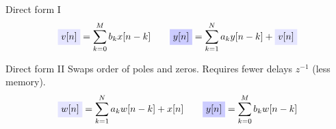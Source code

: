 \documentclass[10pt]{beamer}
\begin{document}
\begin{frame}{Direct form I}
	\begin{equation*}
	\tikz[baseline]{\node[fill=blue!10,anchor=base] {$v[n]$};} = \sum_{k = 0}^{M}b_kx[n-k] \qquad \tikz[baseline]{\node[fill=blue!20,anchor=base] {$y[n]$};} = \sum_{k = 1}^{N}a_ky[n-k] + \tikz[baseline]{\node[fill=blue!10,anchor=base] {$v[n]$};}
	\end{equation*}
\begin{center}
		\resizebox{0.7\textwidth}{!}{}
\end{center}
\end{frame}

\begin{frame}{Direct form II}
	Swaps order of poles and zeros. Requires fewer delays $z^{-1}$ (less memory).
	\begin{equation*}
	\tikz[baseline]{\node[fill=blue!10,anchor=base] {$w[n]$};} = \sum_{k = 1}^{N}a_kw[n-k] + x[n] \qquad \tikz[baseline]{\node[fill=blue!20,anchor=base] {$y[n]$};} = \sum_{k = 0}^{M}b_kw[n-k]
	\end{equation*}
	\begin{center}
		\resizebox{0.55\textwidth}{!}{}
	\end{center}
\end{frame}
\end{document}
